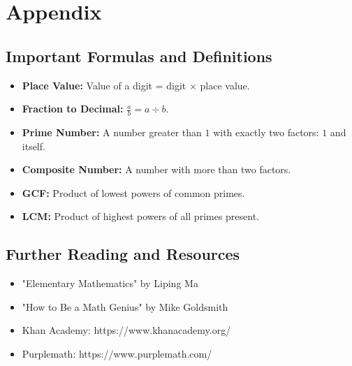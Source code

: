 
\chapter{Appendix}

\section*{Important Formulas and Definitions}

\begin{itemize}
  \item \textbf{Place Value:} Value of a digit = digit $\times$ place value.
  \item \textbf{Fraction to Decimal:} $\frac{a}{b} = a \div b$.
  \item \textbf{Prime Number:} A number greater than $1$ with exactly two factors: $1$ and itself.
  \item \textbf{Composite Number:} A number with more than two factors.
  \item \textbf{GCF:} Product of lowest powers of common primes.
  \item \textbf{LCM:} Product of highest powers of all primes present.
\end{itemize}

\section*{Further Reading and Resources}

\begin{itemize}
  \item "Elementary Mathematics" by Liping Ma
  \item "How to Be a Math Genius" by Mike Goldsmith
  \item Khan Academy: https://www.khanacademy.org/
  \item Purplemath: https://www.purplemath.com/
\end{itemize}

\newpage

